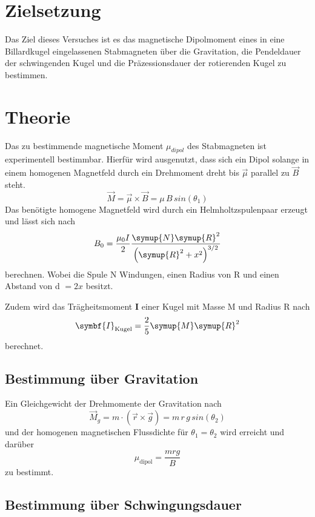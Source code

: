\section{Zielsetzung}
\label{sec:Zielsetzung}

Das Ziel dieses Versuches ist es das magnetische Dipolmoment eines in eine
Billardkugel eingelassenen Stabmagneten über die Gravitation, die Pendeldauer
der schwingenden Kugel und die Präzessionsdauer der rotierenden Kugel zu bestimmen.


\section{Theorie}
\label{sec:Theorie}

Das zu bestimmende magnetische Moment $\mu_{dipol}$ des Stabmagneten
ist experimentell bestimmbar. Hierfür wird ausgenutzt, dass
sich ein Dipol solange in einem homogenen Magnetfeld durch ein
Drehmoment dreht bis $\vec{\mu}$ parallel zu $\vec{B}$ steht.
\begin{equation}
  \vec{M} = \vec{\mu} \times \vec{B} = \mu \, B \, sin(\theta_{1})
  \label{eqn:MB}
\end{equation}
Das benötigte homogene Magnetfeld wird durch ein Helmholtzspulenpaar erzeugt
und lässt sich nach
\begin{equation}
  B_0 = \frac{\mu_0I}{2}\frac{\symup{N}\symup{R}^2}{\left(\symup{R}^2+x^2\right)^{3/2}}
  \label{eqn:b0}
\end{equation}
berechnen. Wobei die Spule N Windungen, einen Radius von R und einen Abstand von d $=2x$
besitzt.

Zudem wird das Trägheitsmoment $\symbf{I}$ einer Kugel mit Masse M und Radius R nach
\begin{equation}
  \symbf{I}_\text{Kugel}=\frac{2}{5}\symup{M}\symup{R}^2
  \label{eqn:Ik}
\end{equation}
berechnet.

\subsection{Bestimmung über Gravitation}
Ein Gleichgewicht der Drehmomente der Gravitation nach
\begin{equation}
  {\vec{M}}_{g}= m \cdot \left(\vec{r}\times\vec{g}\right) = m\, r \, g\, sin(\theta_{2})
\end{equation}
und der homogenen magnetischen Flussdichte %
für $\theta_1 =\theta_2$ wird erreicht und darüber
\begin{equation}
  \mu_\text{dipol}=\frac{mrg}{B}
  \label{eqn:grav}
\end{equation}
zu bestimmt.
\subsection{Bestimmung über Schwingungsdauer}
